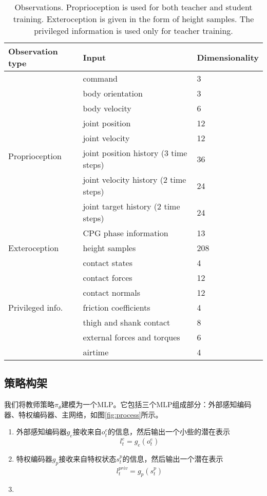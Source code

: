 \begin{table}
  \centering
  \caption{Observations. Proprioception is used for both teacher and student training. Exteroception is given in the form of height samples. The privileged information is used only for teacher training.}
  \label{tb:observations}
  \begin{tabular}{l|ll}
    \hline
    Observation type & Input & Dimensionality\\
    \hline
    \multirow{9}{*}{Proprioception} & command & 3\\
    &body orientation & 3\\
    &body velocity & 6 \\
    &joint position & 12 \\
    &joint velocity & 12 \\
    &joint position history (3 time steps) & 36\\
    &joint velocity history (2 time steps) & 24 \\
    &joint target history (2 time steps) & 24 \\
    &CPG phase information & 13 \\
    \hline
    Exteroception & height samples & 208\\
    \hline
    \multirow{8}{*}{Privileged info.} & contact states & 4\\
    &contact forces & 12\\
    &contact normals & 12 \\
    &friction coefficients & 4\\
    &thigh and shank contact & 8 \\
    &external forces and torques & 6\\
    &airtime & 4 \\
    \hline 
  \end{tabular}
\end{table}


\subsection[策略构架]{策略构架}

我们将教师策略$\pi_{\theta}$建模为一个MLP。它包括三个MLP组成部分：外部感知编码器、特权编码器、主网络，如图\ref{fig:process}所示。
\begin{enumerate}
  \item 外部感知编码器$g_e$接收来自$o_t^e$的信息，然后输出一个小些的潜在表示$$l_t^e=g_e(o_t^e)$$
  \item 特权编码器$g_p$接收来自特权状态$s_t^p$的信息，然后输出一个潜在表示$$l_t^{priv}=g_p(s_t^p)$$
  \item 
\end{enumerate}

